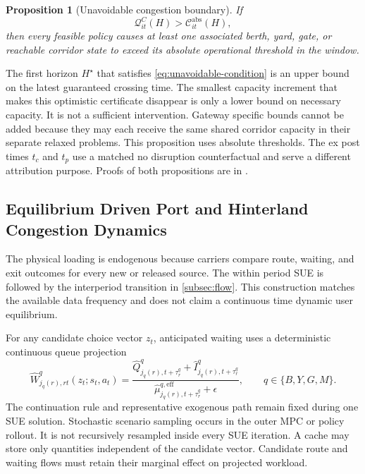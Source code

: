 \documentclass[a4paper,fleqn]{cas-sc}
\newtheorem{proposition}{Proposition}
\begin{document}
\begin{proposition}[Unavoidable congestion boundary]
\label{prop:absorption}
If
\begin{equation}
 \mathcal Q^C_{it}(H)>
 \mathcal C^{\mathrm{abs}}_{it}(H),
 \label{eq:unavoidable-condition}
\end{equation}
then every feasible policy causes at least one associated berth, yard, gate,
or reachable corridor state to exceed its absolute operational threshold in
the window.
\end{proposition}
The first horizon $H^\star$ that satisfies
\cref{eq:unavoidable-condition} is an upper bound on the latest guaranteed
crossing time. The smallest capacity increment that makes this optimistic
certificate disappear is only a lower bound on necessary capacity. It is not a
sufficient intervention. Gateway specific bounds cannot be added because they
may each receive the same shared corridor capacity in their separate relaxed
problems. This proposition uses absolute thresholds. The ex post times $t_c$
and $t_p$ use a matched no disruption counterfactual and serve a different
attribution purpose. Proofs of both propositions are in
.

\subsection{Equilibrium Driven Port and Hinterland Congestion Dynamics}
\label{subsec:dynamics}

The physical loading is endogenous because carriers compare route, waiting,
and exit outcomes for every new or released source. The within period SUE is
followed by the interperiod transition in \cref{subsec:flow}. This construction
matches the available data frequency and does not claim a continuous time
dynamic user equilibrium.

For any candidate choice vector $z_t$, anticipated waiting uses a deterministic
continuous queue projection
\begin{equation}
 \widehat W^q_{j_q(r),rt}(z_t;s_t,a_t)=
 \frac{
 \widehat Q^q_{j_q(r),t+\tau_r^q}
 +\widehat I^q_{j_q(r),t+\tau_r^q}
 }{
 \widehat\mu^{q,\mathrm{eff}}_{j_q(r),t+\tau_r^q}
 +\epsilon
 },
 \qquad q\in\{B,Y,G,M\}.
 \label{eq:anticipated-wait}
\end{equation}
The continuation rule and representative exogenous path remain fixed during
one SUE solution. Stochastic scenario sampling occurs in the outer MPC or
policy rollout. It is not recursively resampled inside every SUE iteration.
A cache may store only quantities independent of the candidate vector.
Candidate route and waiting flows must retain their marginal effect on
projected workload.
\end{document}
